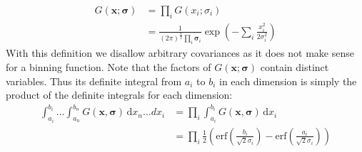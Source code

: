 \documentclass[thesis.tex]{subfiles}
\begin{document}
%
\begin{align}
G(\mathbf{x};\boldsymbol{\sigma})
&= \prod_i G(x_i;\sigma_i) \\
&= \frac{1}{(2\pi)^\frac{n}{2} \prod_i \mathbf{\sigma}_i}
\exp\left( -\sum_i \frac{x_i^2}{2 \sigma_i^2} \right)
\end{align}
%
With this definition we disallow arbitrary covariances as it does not make sense for a binning function. Note that the factors of $G(\mathbf{x};\boldsymbol{\sigma})$ contain distinct variables. Thus its definite integral from $a_i$ to $b_i$ in each dimension is simply the product of the definite integrals for each dimension:
%
\begin{align}
\int_{a_i}^{b_i} \dots \int_{a_n}^{b_n} G(\mathbf{x},\boldsymbol{\sigma}) \,\mathrm d{x_n} \dots d{x_i}
&= \prod_i \int_{a_i}^{b_i} G(\mathbf{x},\boldsymbol{\sigma}) \,\mathrm d{x_i} \\
&= \prod_i \frac{1}{2} \left(
\mathrm{erf} \left( \frac{b_i}{\sqrt{2} \sigma_i} \right) -
\mathrm{erf} \left( \frac{a_i}{\sqrt{2} \sigma_i} \right)
\right)
\end{align}
%
\end{document}
